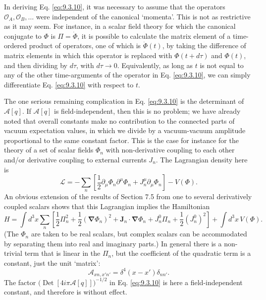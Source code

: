 In deriving Eq. \eqref{eq:9.3.10}, it was necessary to assume that the operators
$\mathcal O_A,\mathcal O_B,\ldots$ were independent of the canonical
`momenta'. This is not as restrictive as it may seem. For instance, in a
scalar field theory for which the canonical conjugate to $\Phi$ is
$\Pi=\dot\Phi$, it is possible to calculate the matrix element of a
time-ordered product of operators, one of which is $\dot\Phi(t)$, by taking
the difference of matrix elements in which this operator is replaced with
$\Phi(t+d\tau)$ and $\Phi(t)$, and then dividing by $d\tau$, with
$d\tau\to0$. Equivalently, as long as $t$ is not equal to any of the other
time-arguments of the operator in Eq. \eqref{eq:9.3.10}, we can simply differentiate
Eq. \eqref{eq:9.3.10} with respect to $t$.

The one serious remaining complication in Eq. \eqref{eq:9.3.10} is the determinant of
$\mathcal A[q]$. If $\mathcal A[q]$ is field-independent, then this is no
problem; we have already noted that overall constants make no contribution to
the connected parts of vacuum expectation values, in which we divide by a
vacuum-vacuum amplitude proportional to the same constant factor. This is the
case for instance for the theory of a set of scalar fields $\Phi_n$ with
non-derivative coupling to each other and/or derivative coupling to external
currents $J_n$. The Lagrangian density here is
\[
\mathcal L=-\sum_n\left[\frac12\partial_\mu\Phi_n\partial^\mu\Phi_n
 +J_n^\mu\partial_\mu\Phi_n\right]-V(\Phi).
\]
An obvious extension of the results of Section 7.5 from one to several
derivatively coupled scalars shows that this Lagrangian implies the Hamiltonian
\[
H=\int d^3x\sum_n\left[\frac12\Pi_n^2+\frac12(\boldsymbol\nabla\Phi_n)^2
 +\mathbf J_n\cdot\boldsymbol\nabla\Phi_n+J_n^0\Pi_n
 +\frac12(J_n^0)^2\right]+\int d^3x\,V(\Phi).
\]
(The $\Phi_n$ are taken to be real scalars, but complex scalars can be
accommodated by separating them into real and imaginary parts.) In general
there is a non-trivial term that is linear in the $\Pi_n$, but the coefficient
of the quadratic term is a constant, just the unit `matrix':
\[
\mathcal A_{xn,x'n'}=\delta^4(x-x')\delta_{nn'}.
\]
The factor $\bigl(\operatorname{Det}[4i\pi\mathcal A[q]]\bigr)^{-1/2}$ in
Eq. \eqref{eq:9.3.10} is here a field-independent constant, and therefore is without
effect.

